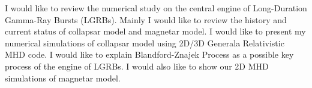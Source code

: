 


\bigskip



\bigskip

\noindent I would like to review the numerical study on the central engine of Long-Duration Gamma-Ray Bursts (LGRBs). Mainly I would like to review the history and current status of collapsar model and magnetar model. I would like to present my numerical simulations of collapsar model using 2D/3D Generala Relativistic MHD code. I would like to explain Blandford-Znajek Process as a possible key process of the engine of LGRBs. I would also like to show our 2D MHD simulations of magnetar model.
